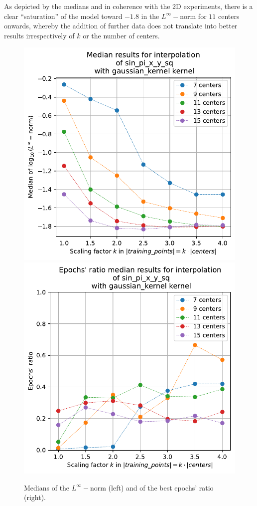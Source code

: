 \documentclass[12pt]{report} %
\begin{document}
As depicted by the medians and in coherence with the 2D experiments, there is a clear ``saturation'' of the model toward $-1.8$ in the $L^\infty-$norm for $11$ centers onwards, whereby the addition of further data does not translate into better results irrespectively of $k$ or the number of centers. 


\begin{figure}[h]
  {\includegraphics[height=.45\textwidth]
  {imagenes/experiments/2d/sin_pi_x_y_sq_interpolation/medians_linf_sin_pi_x_y_sq_gaussian_kernel.pdf}}
  {\includegraphics[height=.45\textwidth]
  {imagenes/experiments/2d/sin_pi_x_y_sq_interpolation/medians_epochs_sin_pi_x_y_sq_gaussian_kernel.pdf}}
  \caption{Medians of the $L^\infty-$norm (left) and of the best epochs' ratio (right).}
  \label{fig:medians-epochs-statistic-sin-pi-x-y-sq}
\end{figure}
\end{document}
